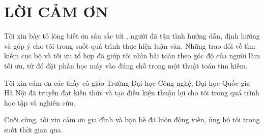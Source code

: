 \section*{\centering LỜI CẢM ƠN}

Tôi xin bày tỏ lòng biết ơn sâu sắc tới \gvhd, người đã tận tình hướng dẫn, định hướng và góp ý cho tôi trong suốt quá trình thực hiện luận văn. Những trao đổi về tìm kiếm cục bộ và tối ưu tổ hợp đã giúp tôi nhìn bài toán theo góc độ của người làm tối ưu, từ đó đặt phần học máy vào đúng chỗ trong một thuật toán tìm kiếm.

Tôi xin cảm ơn các thầy cô giáo Trường Đại học Công nghệ, Đại học Quốc gia Hà Nội đã truyền đạt kiến thức và tạo điều kiện thuận lợi cho tôi trong quá trình học tập và nghiên cứu.

Cuối cùng, tôi xin cảm ơn gia đình và bạn bè đã luôn động viên, ủng hộ tôi trong suốt thời gian qua.

\newpage

